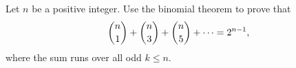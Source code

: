 Let $n$ be a positive integer. Use the binomial theorem to prove that
\[
\dbinom{n}{1}+\dbinom{n}{3}+\dbinom{n}{5}+\cdots=2^{n-1},
\]
where the sum runs over all odd $k\le n$.
